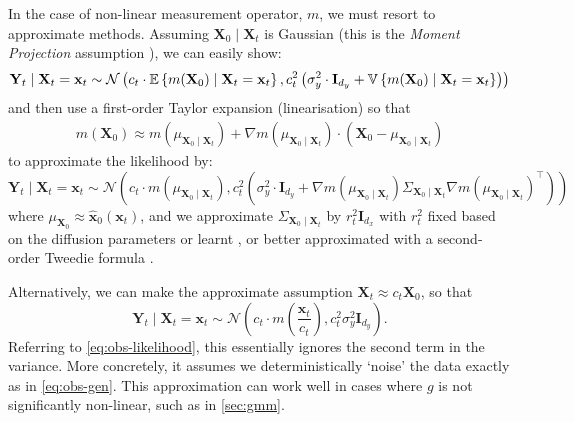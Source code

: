 In the case of non-linear measurement operator, $m$, we must resort to approximate methods.
Assuming $\mathbf{X}_0 \mid \mathbf{X}_t$ is Gaussian (this is the \emph{Moment Projection}
assumption \parencite{boysTweedieMomentProjected2023}), we can easily show:
\begin{equation*}
    \mathbf{Y}_t \mid \mathbf{X}_t = \mathbf{x}_t \sim \mathcal{N}\left(c_t\cdot\mathbb{E} \left\{ m(\mathbf{X}_0) \mid \mathbf{X}_t = \mathbf{x}_t \right\}, c_t^2\left(\sigma_y^2\cdot \mathbf{I}_{d_y} + \mathbb{V} \left\{ m(\mathbf{X}_0) \mid \mathbf{X}_t = \mathbf{x}_t \right\}\right)\right)
\end{equation*}
and then use a first-order Taylor expansion (linearisation) so that
\begin{eqnarray}
    m(\mathbf{X}_0) \approx m(\mu_{\mathbf{X}_0 \mid \mathbf{X}_t}) + \nabla m(\mu_{\mathbf{X}_0 \mid \mathbf{X}_t})\cdot (\mathbf{X}_0 - \mu_{\mathbf{X}_0 \mid \mathbf{X}_t})
\end{eqnarray}
to approximate the likelihood by:
\begin{equation*}
    \mathbf{Y}_t \mid \mathbf{X}_t = \mathbf{x}_t \sim \mathcal{N}\left(c_t\cdot m(\mu_{\mathbf{X}_0 \mid \mathbf{X}_t}), c_t^2\left(\sigma_y^2\cdot \mathbf{I}_{d_y} + \nabla m(\mu_{\mathbf{X}_0 \mid \mathbf{X}_t})\Sigma_{\mathbf{X}_0 \mid \mathbf{X}_t}\nabla m(\mu_{\mathbf{X}_0 \mid \mathbf{X}_t})^\top\right)\right)
\end{equation*}
where $\mu_{\mathbf{X}_0} \approx \hat{\mathbf{x}}_0(\mathbf{x}_t)$, and we approximate
$\Sigma_{\mathbf{X}_0 \mid \mathbf{X}_t}$ by $r_t^2\mathbf{I}_{d_x}$ with $r_t^2$ fixed based on
the diffusion parameters \parencite{hoDenoisingDiffusionProbabilistic2020} or learnt
\parencite{nicholImprovedDenoisingDiffusion2021}, or better approximated with a second-order
Tweedie formula \parencite{boysTweedieMomentProjected2023}.

Alternatively, we can make the approximate assumption $\mathbf{X}_t \approx c_t\mathbf{X}_0$, so
that
\begin{equation*}
    \mathbf{Y}_t \mid \mathbf{X}_t = \mathbf{x}_t \sim \mathcal{N}\left(c_t\cdot m\left(\frac{\mathbf{x}_t}{c_t}\right), c_t^2\sigma_y^2\mathbf{I}_{d_y}\right).
\end{equation*}
Referring to \ref{eq:obs-likelihood}, this essentially ignores the second term in the variance.
More concretely, it assumes we deterministically `noise' the data exactly as in \ref{eq:obs-gen}.
This approximation can work well in cases where $g$ is not significantly non-linear, such as in
\autoref{sec:gmm}.


